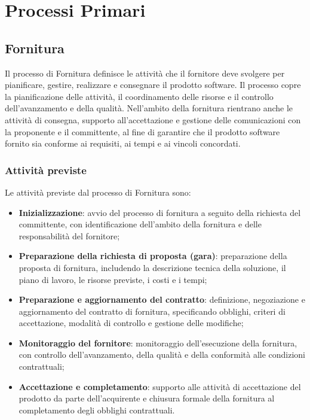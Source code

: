 \documentclass[a4paper,12pt]{article}
\begin{document}
\newpage

\section{Processi Primari}
    \subsection{Fornitura}
        Il processo di Fornitura definisce le attività che il fornitore deve svolgere per pianificare, gestire, realizzare e consegnare il prodotto software.
        Il processo copre la pianificazione delle attività, il coordinamento delle risorse e il controllo dell'avanzamento e della qualità.
        Nell'ambito della fornitura rientrano anche le attività di consegna, supporto all'accettazione e gestione delle comunicazioni con la proponente e il committente, al fine di garantire che il prodotto software fornito sia conforme ai requisiti, ai tempi e ai vincoli concordati.
        
        \subsubsection{Attività previste}
            Le attività previste dal processo di Fornitura sono:
            \begin{itemize}
                \item \textbf{Inizializzazione}: avvio del processo di fornitura a seguito della richiesta del committente, con identificazione dell'ambito della fornitura e delle responsabilità del fornitore;
                \item \textbf{Preparazione della richiesta di proposta (gara)}: preparazione della proposta di fornitura, includendo la descrizione tecnica della soluzione, il piano di lavoro, le risorse previste, i costi e i tempi;
                \item \textbf{Preparazione e aggiornamento del contratto}: definizione, negoziazione e aggiornamento del contratto di fornitura, specificando obblighi, criteri di accettazione, modalità di controllo e gestione delle modifiche;
                \item \textbf{Monitoraggio del fornitore}: monitoraggio dell'esecuzione della fornitura, con controllo dell'avanzamento, della qualità e della conformità alle condizioni contrattuali;
                \item \textbf{Accettazione e completamento}: supporto alle attività di accettazione del prodotto da parte dell'acquirente e chiusura formale della fornitura al completamento degli obblighi contrattuali.
            \end{itemize}
        
\end{document}
